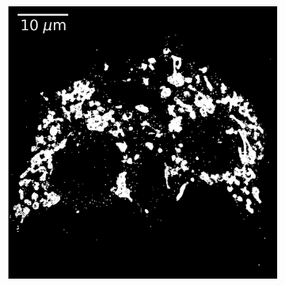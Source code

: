 \begin{figure}
    \begin{subfigure}{0.49\textwidth}
        \includegraphics[width=\textwidth]{figures/mitochondria_image5.png}
        \caption{}
    \end{subfigure}
    \begin{subfigure}{0.49\textwidth}

\end{subfigure}
\end{figure}
